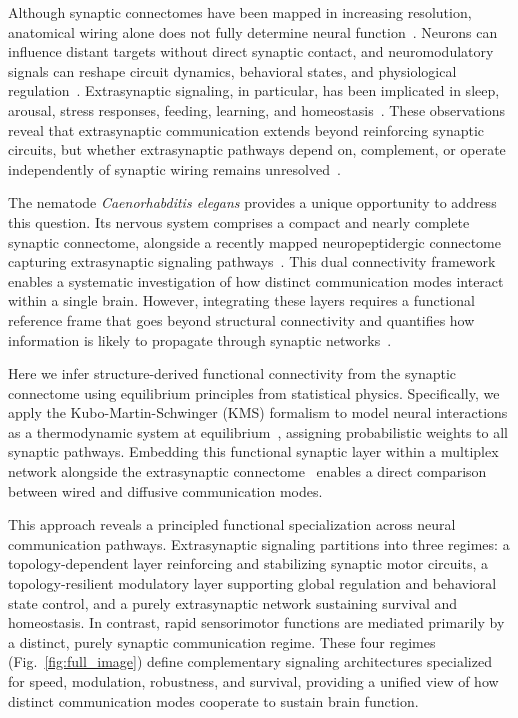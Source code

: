 \documentclass[prx,superscriptaddres, twocolumn]{revtex4-2}
\begin{document}
Although synaptic connectomes have been mapped in increasing resolution, anatomical wiring
alone does not fully determine neural function~\cite{varshney2011structural,cook2019connectome,winding2023insect,Veraszto2024,Scheffer2020}. Neurons can influence distant
targets without direct synaptic contact, and neuromodulatory signals can reshape circuit
dynamics, behavioral states, and physiological regulation~\cite{bentley2016multilayer, Douglas2004}. Extrasynaptic
signaling, in particular, has been implicated in sleep, arousal, stress responses,
feeding, learning, and homeostasis~\cite{ripoll2023neuropeptidergic,flavell2013serotonin, watteyne2024neuropeptide,Barrios2012,atkinson2021ascaris}. These observations reveal that extrasynaptic
communication extends beyond reinforcing synaptic circuits, but whether extrasynaptic
pathways depend on, complement, or operate independently of synaptic wiring remains
unresolved~\cite{bentley2016multilayer}.

The nematode \emph{Caenorhabditis elegans} provides a unique opportunity to address this
question. Its nervous system comprises a compact and nearly complete synaptic connectome,
alongside a recently mapped neuropeptidergic connectome capturing extrasynaptic signaling
pathways~\cite{cook2019connectome,ripoll2023neuropeptidergic}. This dual connectivity framework enables a systematic investigation
of how distinct communication modes interact within a single brain. However, integrating
these layers requires a functional reference frame that goes beyond structural connectivity
and quantifies how information is likely to propagate through synaptic
networks~\cite{Flavell2022}.

Here we infer structure-derived functional connectivity from the synaptic connectome using
equilibrium principles from statistical physics. Specifically, we apply the
Kubo-Martin-Schwinger (KMS) formalism to model neural interactions as a thermodynamic
system at equilibrium~\cite{moutuou2025brain,moutuou2025kubo}, assigning probabilistic
weights to all synaptic pathways. Embedding this functional synaptic layer within a
multiplex network alongside the extrasynaptic connectome~\cite{ripoll2023neuropeptidergic}
enables a direct comparison between wired and diffusive communication modes.

This approach reveals a principled functional specialization across neural communication
pathways. Extrasynaptic signaling partitions into three regimes: a topology-dependent
layer reinforcing and stabilizing synaptic motor circuits, a topology-resilient modulatory
layer supporting global regulation and behavioral state control, and a purely extrasynaptic
network sustaining survival and homeostasis. In contrast, rapid sensorimotor functions are
mediated primarily by a distinct, purely synaptic communication regime. These four regimes (Fig.~\ref{fig:full_image})
define complementary signaling architectures specialized for speed, modulation, robustness,
and survival, providing a unified view of how distinct communication modes cooperate to
sustain brain function. 
\end{document}
